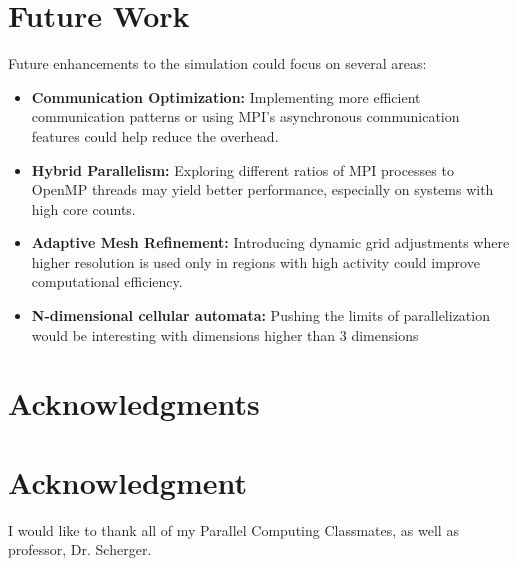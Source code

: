\documentclass[conference,compsoc]{IEEEtran}
\begin{document}
\section{Future Work}
Future enhancements to the simulation could focus on several areas:
\begin{itemize}
    \item \textbf{Communication Optimization:} Implementing more efficient communication patterns or using MPI's asynchronous communication features could help reduce the overhead.
    \item \textbf{Hybrid Parallelism:} Exploring different ratios of MPI processes to OpenMP threads may yield better performance, especially on systems with high core counts.
    \item \textbf{Adaptive Mesh Refinement:} Introducing dynamic grid adjustments where higher resolution is used only in regions with high activity could improve computational efficiency.
    \item \textbf{N-dimensional cellular automata:} Pushing the limits of parallelization would be interesting with dimensions higher than 3 dimensions
\end{itemize}






\ifCLASSOPTIONcompsoc
  \section*{Acknowledgments}
\else
  \section*{Acknowledgment}
\fi

I would like to thank all of my Parallel Computing Classmates, as well as professor, Dr. Scherger. 






\end{document}

